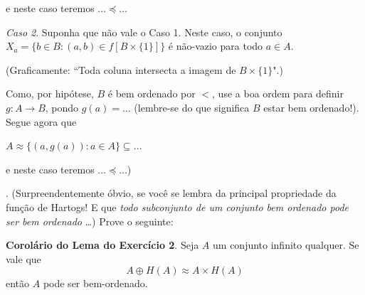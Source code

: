 \documentclass{hipatia}
\newcommand{\bc}{\begin{center}}
\newcommand{\ec}{\end{center}}
\newcommand{\n}{\noindent}
\newcommand{\equip}{\approx}
\newcommand{\esple}{\vspace*{0.3cm}}
\newcommand{\s}{\subseteq}
\newcommand{\dominado}{\preccurlyeq}
\newcommand{\unidis}{\oplus}
\begin{document}
\n e neste caso teremos $\ldots
\dominado\ldots$

\esple

\n \emph{Caso 2}. Suponha que não vale o Caso
1. Neste caso, o conjunto
$X_a = \{b \in B: (a,b)\in f[B \times
\{1\}]\}$ é não-vazio para todo $a \in A$.

(Graficamente: ``Toda coluna intersecta a
imagem de $B \times \{1\}$".)

Como, por hipótese, $B$ é bem ordenado por
$<$, use a boa ordem para definir  $g\colon A
\rightarrow B$,  pondo $g(a) = \ldots$
(lembre-se do que significa $B$ estar bem
ordenado!). Segue agora que

\bc $A \equip \{(a,g(a)): a \in A\} \s \ldots
$ \ec


\n e neste caso teremos  $\ldots \dominado
\ldots$)

\n {\bf Exercício 3}. (Surpreendentemente
óbvio, se você se lembra da principal
propriedade da função de Hartogs! E que {\it
todo subconjunto de um conjunto bem ordenado
pode ser bem ordenado} \ldots) Prove o
seguinte:

{\bf Corolário do Lema do Exercício 2}. Seja
$A$ um conjunto infinito qualquer. Se vale que
$$A \unidis H(A) \equip A \times H(A)$$ então
$A$ pode ser bem-ordenado.
\end{document}
